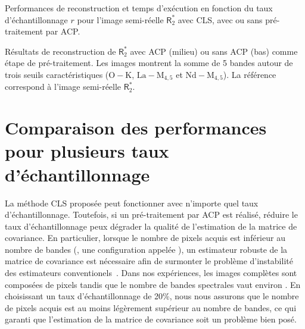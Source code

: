 \begin{normalfigure*}[]
    \hspace{1cm}
    \caption{Performances de reconstruction et temps d'exécution en fonction du taux d'échantillonnage $r$ pour l'image semi-réelle $\mathsf{R}_2^*$ avec CLS,  avec ou sans pré-traitement par ACP.
        \protect\label{fig-CLS-full}}
\end{normalfigure*}

\begin{normalfigure*}[]
    \centering
    
    \caption{Résultats de reconstruction de $\mathsf{R}_2^*$ avec ACP (milieu) ou sans ACP (bas) comme étape de pré-traitement. Les images montrent la somme de 5 bandes autour de trois seuils caractéristiques ($\mathrm{O-K}$, $\mathrm{La-M}_{4, 5}$ et $\mathrm{Nd-M}_{4, 5}$). La référence correspond à l'image semi-réelle $\mathsf{R}_2^*$.
        \protect\label{fig-CLS-full-images}}
\end{normalfigure*}



\section{Comparaison des performances pour plusieurs taux d'échantillonnage}\label{sec-autres-taux-echantillonnage-hr}

La méthode CLS proposée peut fonctionner avec n'importe quel taux d'échantillonnage. Toutefois, si un pré-traitement par ACP est réalisé, réduire le taux d'échantillonnage peux dégrader la qualité de l'estimation de la matrice de covariance. En particulier, lorsque le nombre de pixels acquis est inférieur au nombre de bandes (\ie{}, une configuration appelée ), un estimateur robuste de la matrice de covariance est nécessaire afin de surmonter le problème d'instabilité des estimateurs conventionels~\cite{ledoit2004well}. Dans nos expériences, les images complètes sont composées de  pixels tandis que le nombre de bandes spectrales vaut environ . En choisissant un taux d'échantillonnage de 20\%, nous nous assurons que le nombre de pixels acquis est au moins légèrement supérieur au nombre de bandes, ce qui garanti que l'estimation de la matrice de covariance soit un problème bien posé.

